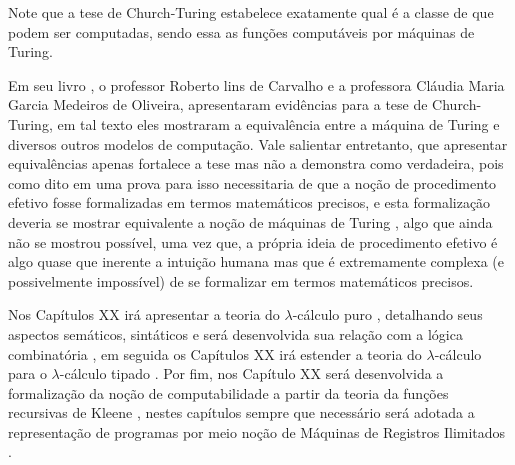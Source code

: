 \begin{rema}
	Note que a tese de Church-Turing estabelece exatamente qual é a classe de que podem ser computadas, sendo essa as funções computáveis por máquinas de Turing.
\end{rema}

Em seu livro \cite{roberto1998}, o professor Roberto lins de Carvalho e a professora Cláudia Maria Garcia Medeiros de Oliveira, apresentaram evidências para a tese de Church-Turing, em tal texto eles mostraram a equivalência entre a máquina de Turing e diversos outros modelos de computação. Vale salientar entretanto, que apresentar equivalências apenas fortalece a tese mas não a demonstra como verdadeira, pois como dito em \cite{benjaLivro2010, roberto1998, sernadas2006} uma prova para isso necessitaria de que a noção de procedimento efetivo fosse formalizadas em termos matemáticos precisos, e esta formalização deveria se mostrar equivalente a noção de máquinas de Turing \cite{benjaLivro2010}, algo que ainda não se mostrou possível, uma vez que, a própria ideia de procedimento efetivo é algo quase que inerente a intuição humana mas que é extremamente complexa (e possivelmente impossível) de se formalizar em termos matemáticos precisos.

Nos Capítulos XX irá apresentar a teoria do $\lambda$-cálculo puro \cite{bare1984, henk1992, hankin2004}, detalhando seus aspectos semáticos, sintáticos e será desenvolvida sua relação com a lógica combinatória \cite{bimbo2019, hankin2004}, em seguida os Capítulos XX irá estender a teoria do $\lambda$-cálculo para o $\lambda$-cálculo tipado \cite{henk1992, hankin2004}. Por fim, nos Capítulo XX será desenvolvida a formalização da noção de computabilidade a partir da teoria da funções recursivas de Kleene \cite{kleene1936}, nestes capítulos sempre que necessário será adotada a representação de programas por meio noção de Máquinas de Registros Ilimitados \cite{cutland1980, menezes2003}. 
